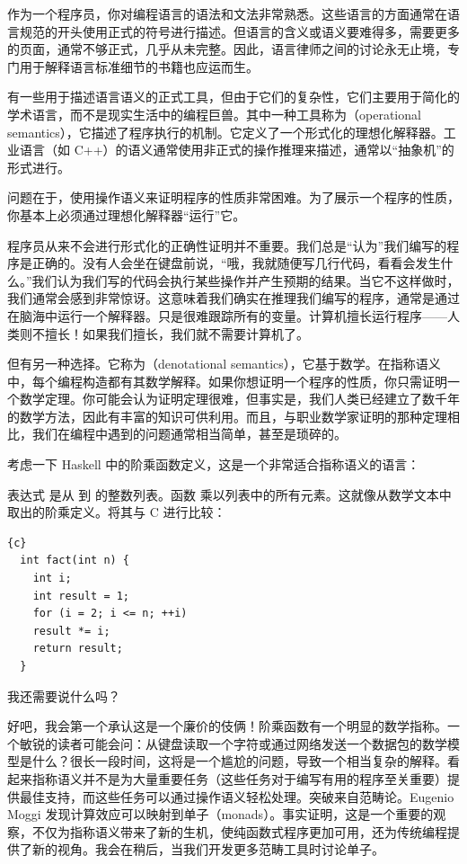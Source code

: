 作为一个程序员，你对编程语言的语法和文法非常熟悉。这些语言的方面通常在语言规范的开头使用正式的符号进行描述。但语言的含义或语义要难得多，需要更多的页面，通常不够正式，几乎从未完整。因此，语言律师之间的讨论永无止境，专门用于解释语言标准细节的书籍也应运而生。

有一些用于描述语言语义的正式工具，但由于它们的复杂性，它们主要用于简化的学术语言，而不是现实生活中的编程巨兽。其中一种工具称为（operational semantics），它描述了程序执行的机制。它定义了一个形式化的理想化解释器。工业语言（如 C++）的语义通常使用非正式的操作推理来描述，通常以“抽象机”的形式进行。

问题在于，使用操作语义来证明程序的性质非常困难。为了展示一个程序的性质，你基本上必须通过理想化解释器“运行”它。

程序员从来不会进行形式化的正确性证明并不重要。我们总是“认为”我们编写的程序是正确的。没有人会坐在键盘前说，“哦，我就随便写几行代码，看看会发生什么。”我们认为我们写的代码会执行某些操作并产生预期的结果。当它不这样做时，我们通常会感到非常惊讶。这意味着我们确实在推理我们编写的程序，通常是通过在脑海中运行一个解释器。只是很难跟踪所有的变量。计算机擅长运行程序——人类则不擅长！如果我们擅长，我们就不需要计算机了。

但有另一种选择。它称为（denotational semantics），它基于数学。在指称语义中，每个编程构造都有其数学解释。如果你想证明一个程序的性质，你只需证明一个数学定理。你可能会认为证明定理很难，但事实是，我们人类已经建立了数千年的数学方法，因此有丰富的知识可供利用。而且，与职业数学家证明的那种定理相比，我们在编程中遇到的问题通常相当简单，甚至是琐碎的。

考虑一下 Haskell 中的阶乘函数定义，这是一个非常适合指称语义的语言：

表达式 \code{{[}1..n{]}} 是从  到  的整数列表。函数  乘以列表中的所有元素。这就像从数学文本中取出的阶乘定义。将其与 C 进行比较：

\begin{lstlisting}{c}
  int fact(int n) {
    int i;
    int result = 1;
    for (i = 2; i <= n; ++i)
    result *= i;
    return result;
  }
\end{lstlisting}
我还需要说什么吗？

好吧，我会第一个承认这是一个廉价的伎俩！阶乘函数有一个明显的数学指称。一个敏锐的读者可能会问：从键盘读取一个字符或通过网络发送一个数据包的数学模型是什么？很长一段时间，这将是一个尴尬的问题，导致一个相当复杂的解释。看起来指称语义并不是为大量重要任务（这些任务对于编写有用的程序至关重要）提供最佳支持，而这些任务可以通过操作语义轻松处理。突破来自范畴论。Eugenio Moggi 发现计算效应可以映射到单子（monads）。事实证明，这是一个重要的观察，不仅为指称语义带来了新的生机，使纯函数式程序更加可用，还为传统编程提供了新的视角。我会在稍后，当我们开发更多范畴工具时讨论单子。

